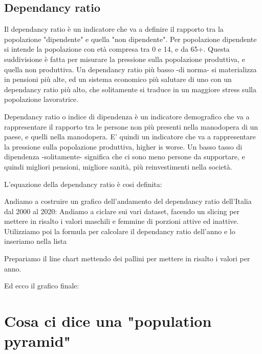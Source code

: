 \documentclass[11pt, oneside]{article}
\begin{document}
\subsection{Dependancy ratio}
Il dependancy ratio è un indicatore che va a definire il rapporto tra la popolazione "dipendente" e quella "non dipendente". Per popolazione dipendente si intende la popolazione con età compresa tra 0 e 14, e da 65+.
Questa suddivisione è fatta per misurare la pressione sulla popolazione produttiva, e quella non produttiva. Un dependancy ratio più basso -di norma- si materializza in pensioni più alte, ed un sistema economico più salutare di uno con un dependancy ratio più alto, che solitamente si traduce in un maggiore stress sulla popolazione lavoratrice.

Dependancy ratio o indice di dipendenza è un indicatore demografico che va a rappresentare il rapporto tra le persone non più presenti nella manodopera di un paese, e quelli nella manodopera. E' quindi un indicatore che va a rappresentare la pressione sulla popolazione produttiva, higher is worse. Un basso tasso di dipendenza -solitamente- significa che ci sono meno persone da supportare, e quindi migliori pensioni, migliore sanità, più reinvestimenti nella società.


L'equazione della dependancy ratio è cosi definita:
\begin{center}
\end{center}
Andiamo a costruire un grafico dell'andamento del dependancy ratio dell'Italia dal 2000 al 2020:
Andiamo a ciclare sui vari dataset, facendo un slicing per mettere in risalto i valori maschili e femmine di porzioni attive ed inattive. Utilizziamo poi la formula per calcolare il dependancy ratio dell'anno e lo inseriamo nella lista
\begin{center}
\end{center}
Prepariamo il line chart mettendo dei pallini per mettere in risalto i valori per anno.
\begin{center}
\end{center}
Ed ecco il grafico finale:
\begin{center}
\end{center}

\section{Cosa ci dice una "population pyramid"}
\end{document}

